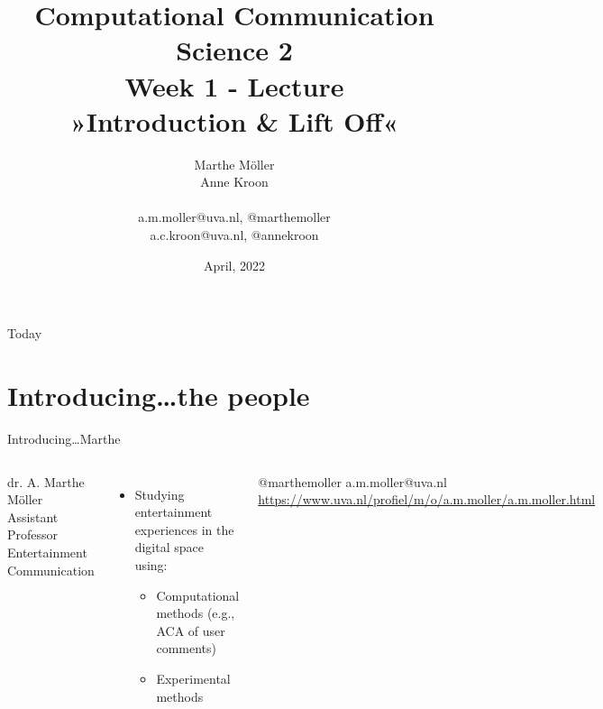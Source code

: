 \documentclass[handout]{beamer}
\title[Computational Communication Science 2]{\textbf{Computational Communication Science 2} \\Week 1 - Lecture\\ »Introduction \& Lift Off«}
\author[Marthe Möller, Anne Kroon]{Marthe Möller \\ Anne Kroon \\ ~ \\ \footnotesize{a.m.moller@uva.nl, @marthemoller \\a.c.kroon@uva.nl, @annekroon} \\}
\date{April, 2022}
\institute[Digital Society Minor, University of Amsterdam]{Digital Society Minor, University of Amsterdam}
\begin{document}
	
	\begin{frame}{}
		\titlepage
	\end{frame}
	
	\begin{frame}{Today}
		\tableofcontents
	\end{frame}


\section{Introducing\ldots the people}


\begin{frame}{Introducing\ldots \huge{Marthe}} 
	
	\begin{columns}
		dr. A. Marthe Möller \\
		Assistant Professor Entertainment Communication
		\begin{itemize}
			\item Studying entertainment experiences in the digital space using:
			\begin{itemize}
				\item Computational methods (e.g., ACA of user comments)
				\item Experimental methods
			\end{itemize}
		\end{itemize}
		@marthemoller \textbar a.m.moller@uva.nl \textbar \url{https://www.uva.nl/profiel/m/o/a.m.moller/a.m.moller.html} 
	\end{columns}
\end{frame}
\end{document}
